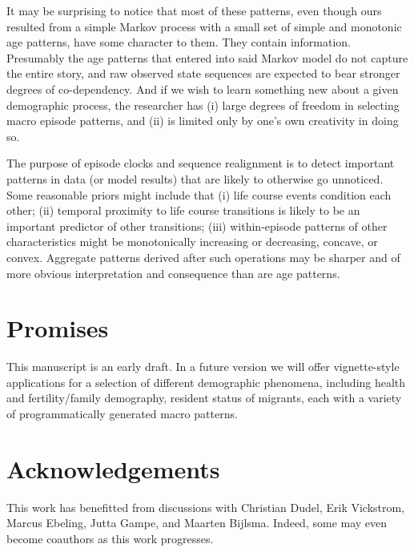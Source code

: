 \documentclass{article}
\begin{document}
It may be surprising to notice that most of these patterns, even though ours resulted from a simple Markov process with a small set of simple and monotonic age patterns, have some character to them. They contain information. Presumably the age patterns that entered into said Markov model do not capture the entire story, and raw observed state sequences are expected to bear stronger degrees of co-dependency. And if we wish to learn something new about a given demographic process, the researcher has (i) large degrees of freedom in selecting macro episode patterns, and (ii) is limited only by one's own creativity in doing so. 

The purpose of episode clocks and sequence realignment is to detect important patterns in data (or model results) that are likely to otherwise go unnoticed. Some reasonable priors might include that (i) life course events condition each other; (ii) temporal proximity to life course transitions is likely to be an important predictor of other transitions; (iii) within-episode patterns of other characteristics might be monotonically increasing or decreasing, concave, or convex. Aggregate patterns derived after such operations may be sharper and of more obvious interpretation and consequence than are age patterns. 

\section*{Promises}
This manuscript is an early draft. In a future version we will offer vignette-style applications for a selection of different demographic phenomena, including health and fertility/family demography, resident status of migrants, each with a variety of programmatically generated macro patterns. 

\section*{Acknowledgements}
This work has benefitted from discussions with Christian Dudel, Erik Vickstrom, Marcus Ebeling, Jutta Gampe, and Maarten Bijlsma. Indeed, some may even become coauthors as this work progresses.

\FloatBarrier
\singlespacing

   
\end{document}
